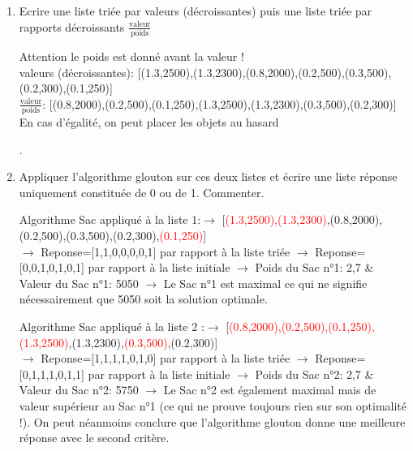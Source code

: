 \documentclass[12pt,french]{article}
\begin{document}
\begin{enumerate}
	\item Ecrire une liste triée par valeurs (décroissantes) puis une liste triée par rapports décroissants $\frac{\text{valeur}}{\text{poids}}$
		\begin{tcolorbox}[enhanced,attach boxed title to top center={yshift=-3mm,yshifttext=-1mm},
		colback=blue!5!white,colframe=blue!75!black,colbacktitle=blue!25!black,
		title=solution :, fonttitle=\bfseries,
		boxed title style={size=small,colframe=green!25!black} ]
	Attention le poids est donné avant la valeur ! \\
	valeurs (décroissantes):  [(1.3,2500),(1.3,2300),(0.8,2000),(0.2,500),(0.3,500),(0.2,300),(0.1,250)]\\
	$\frac{\text{valeur}}{\text{poids}}$:  [(0.8,2000),(0.2,500),(0.1,250),(1.3,2500),(1.3,2300),(0.3,500),(0.2,300)]\\
		En cas d'égalité, on peut placer les objets au hasard
		\end{tcolorbox}
	\vspace{2mm}
.
	
	\item Appliquer l'algorithme glouton sur ces deux listes et écrire une liste réponse uniquement constituée de 0 ou de 1. Commenter.
		\begin{tcolorbox}[enhanced,attach boxed title to top center={yshift=-3mm,yshifttext=-1mm},
		colback=blue!5!white,colframe=blue!75!black,colbacktitle=blue!25!black,
		title=solution :, fonttitle=\bfseries,
		boxed title style={size=small,colframe=green!25!black} ]
		Algorithme Sac appliqué à la liste 1:\tabto{0.2cm}$\rightarrow$  [\textcolor{red}{(1.3,2500),(1.3,2300)},(0.8,2000),(0.2,500),(0.3,500),(0.2,300),\textcolor{red}{(0.1,250)}]\\
		\tabto{0.2cm}$\rightarrow$ Reponse=[1,1,0,0,0,0,1] par rapport à la liste triée
		\tabto{0.2cm}$\rightarrow$ Reponse=[0,0,1,0,1,0,1] par rapport à la liste initiale
		\tabto{0.2cm}$\rightarrow$ Poids du Sac n°1: 2,7 \& Valeur du Sac n°1: 5050
		\tabto{0.2cm}$\rightarrow$ Le Sac n°1 est maximal ce qui ne signifie nécessairement que 5050 soit la solution optimale.
		\vspace{2mm}
		
			Algorithme Sac appliqué à la liste 2 :\tabto{0.2cm}$\rightarrow$   [\textcolor{red}{(0.8,2000),(0.2,500),(0.1,250),(1.3,2500)},(1.3,2300),\textcolor{red}{(0.3,500)},(0.2,300)]\\
		\tabto{0.2cm}$\rightarrow$ Reponse=[1,1,1,1,0,1,0] par rapport à la liste triée
		\tabto{0.2cm}$\rightarrow$ Reponse=[0,1,1,1,0,1,1] par rapport à la liste initiale
		\tabto{0.2cm}$\rightarrow$ Poids du Sac n°2: 2,7 \& Valeur du Sac n°2: 5750
		\tabto{0.2cm}$\rightarrow$ Le Sac n°2 est également maximal mais de valeur supérieur au Sac n°1 (ce qui ne prouve toujours rien sur son optimalité !). On peut néanmoins conclure que l'algorithme glouton donne une meilleure réponse avec le second critère.
		

\end{tcolorbox}
\end{enumerate}
\end{document}
